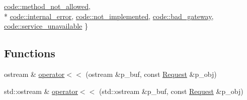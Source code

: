 \begin{DoxyCompactItemize}
\hyperlink{namespacextd_1_1network_1_1http_a55148922a7d13fe756e53e2ccad4b89cadd115df9e077388e1b70b344325094f3}{code\-::method\-\_\-not\-\_\-allowed}, 
\\*
\hyperlink{namespacextd_1_1network_1_1http_a55148922a7d13fe756e53e2ccad4b89ca3d9fd48f8a61d2ef1bcabffb3e2c2336}{code\-::internal\-\_\-error}, 
\hyperlink{namespacextd_1_1network_1_1http_a55148922a7d13fe756e53e2ccad4b89ca63877363c706f5095d05a54f8b57b0ae}{code\-::not\-\_\-implemented}, 
\hyperlink{namespacextd_1_1network_1_1http_a55148922a7d13fe756e53e2ccad4b89ca34b1f5a8577eed2180e10076d1aad14c}{code\-::bad\-\_\-gateway}, 
\hyperlink{namespacextd_1_1network_1_1http_a55148922a7d13fe756e53e2ccad4b89ca512d23352b911a1e9be84b5119e39095}{code\-::service\-\_\-unavailable}
 \}
\end{DoxyCompactItemize}
\subsection*{Functions}
\begin{DoxyCompactItemize}
\item 
ostream \& \hyperlink{namespacextd_1_1network_1_1http_a9cd58530344372f236be8478d9c41ac3}{operator$<$$<$} (ostream \&p\-\_\-buf, const \hyperlink{classxtd_1_1network_1_1http_1_1Request}{Request} \&p\-\_\-obj)
\item 
std\-::ostream \& \hyperlink{namespacextd_1_1network_1_1http_a48e500be5ba75ae2ce3d8bdb549f9211}{operator$<$$<$} (std\-::ostream \&p\-\_\-buf, const \hyperlink{classxtd_1_1network_1_1http_1_1Request}{Request} \&p\-\_\-obj)
\end{DoxyCompactItemize}


